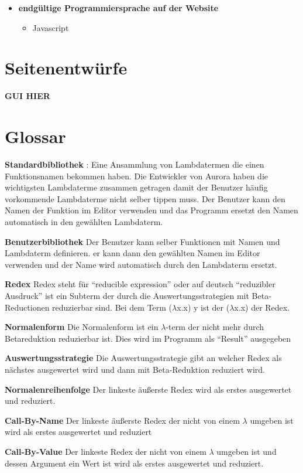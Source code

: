 \documentclass[parskip=full,11pt,twoside]{scrartcl}
\begin{document}
\begin{description}
\begin{itemize}
\begin{itemize}
			\end{itemize}
		\item \textbf{endgültige Programmiersprache auf der Website}
			\begin{itemize}
				\item Javascript
			\end{itemize}
	\end{itemize}
\newpage
\appendix
\end{description}
\section{Seitenentwürfe}
\textbf{GUI HIER}



\section{Glossar}

\textbf{Standardbibliothek} :
Eine Ansammlung von Lambdatermen die einen Funktionsnamen bekommen haben. Die Entwickler von Aurora haben die wichtigsten Lambdaterme zusammen getragen damit der Benutzer häufig vorkommende Lambdaterme nicht selber tippen muss. Der Benutzer kann den Namen der Funktion im Editor verwenden und das Programm ersetzt den Namen automatisch in den gewählten Lambdaterm.

\textbf{Benutzerbibliothek}
Der Benutzer kann selber Funktionen mit Namen und Lambdaterm definieren. er kann dann den gewählten Namen im Editor verwenden und der Name wird automatisch durch den Lambdaterm ersetzt.

\textbf {Redex}
Redex steht für \enquote{reducible expression} oder auf deutsch \enquote{reduzibler Ausdruck} ist ein Subterm der durch die Auswertungsstrategien mit Beta-Reductionen reduzierbar sind.
Bei dem Term ($\lambda$x.x) y ist der ($\lambda$x.x) der Redex.

\textbf{Normalenform}
Die Normalenform ist ein $\lambda$-term der nicht mehr durch Betareduktion reduzierbar ist. Dies wird im Programm als \enquote{Result} ausgegeben

\textbf{Auswertungsstrategie}
Die Auswertungsstrategie gibt an welcher Redex als nächstes ausgewertet wird und dann mit Beta-Reduktion reduziert wird.

\textbf{Normalenreihenfolge}
Der linkeste äußerste Redex wird als erstes ausgewertet und reduziert.

\textbf{Call-By-Name}
Der linkeste äußerste Redex der nicht von einem $\lambda$ umgeben ist wird als erstes ausgewertet und reduziert

\textbf{Call-By-Value}
Der linkeste Redex der nicht von einem $\lambda$ umgeben ist und dessen Argument ein Wert ist wird als erstes ausgewertet und reduziert.
 
\end{document}
